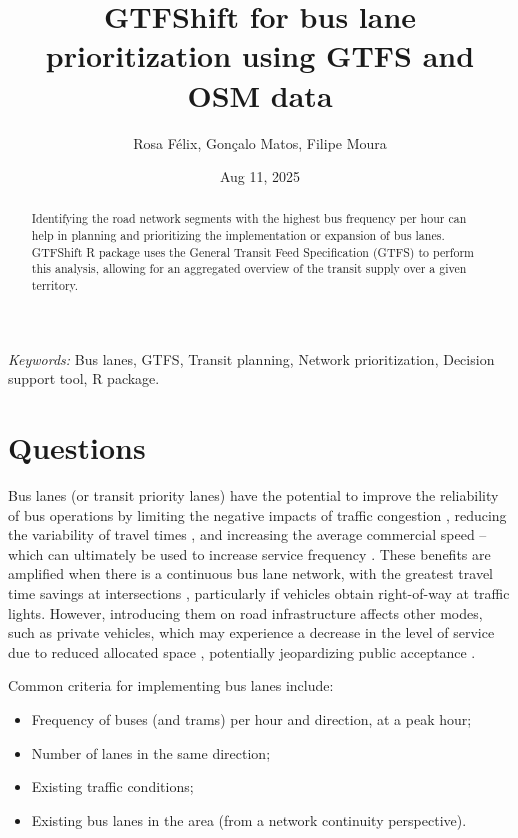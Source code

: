\documentclass[
]{article}
\title{GTFShift for bus lane prioritization using GTFS and OSM data}
\author{Rosa Félix, Gonçalo Matos, Filipe Moura}
\date{Aug 11, 2025}
\providecommand{\tightlist}{%
  \setlength{\itemsep}{0pt}\setlength{\parskip}{0pt}}
\begin{document}
\maketitle
\begin{abstract}
Identifying the road network segments with the highest bus frequency per hour can help in planning and prioritizing the implementation or expansion of bus lanes. GTFShift R package uses the General Transit Feed Specification (GTFS) to perform this analysis, allowing for an aggregated overview of the transit supply over a given territory.
\end{abstract}

\textit{Keywords:} Bus lanes, GTFS, Transit planning, Network prioritization, Decision support tool, R package.

\section{Questions}\label{questions}

Bus lanes (or transit priority lanes) have the potential to improve the reliability of bus operations by limiting the negative impacts of traffic congestion \citep{cesme2018}, reducing the variability of travel times \citep{surprenant-legault-2011}, and increasing the average commercial speed -- which can ultimately be used to increase service frequency \citep{basso-2011}.
These benefits are amplified when there is a continuous bus lane network, with the greatest travel time savings at intersections \citep{truong-2015}, particularly if vehicles obtain right-of-way at traffic lights.
However, introducing them on road infrastructure affects other modes, such as private vehicles, which may experience a decrease in the level of service due to reduced allocated space \citep{arasan-2010}, potentially jeopardizing public acceptance \citep{batty-2014}.

Common criteria for implementing bus lanes include:

\begin{itemize}
\tightlist
\item
  Frequency of buses (and trams) per hour and direction, at a peak hour;
\item
  Number of lanes in the same direction;
\item
  Existing traffic conditions;
\item
  Existing bus lanes in the area (from a network continuity perspective).
\end{itemize}
\end{document}
